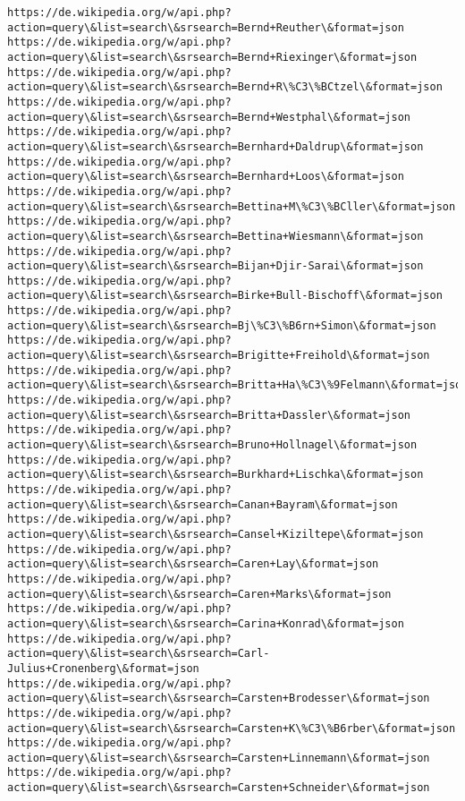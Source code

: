 \documentclass[11pt]{article}
\begin{document}
\begin{Verbatim}[commandchars=\\\{\}]
https://de.wikipedia.org/w/api.php?action=query\&list=search\&srsearch=Bernd+Reuther\&format=json
https://de.wikipedia.org/w/api.php?action=query\&list=search\&srsearch=Bernd+Riexinger\&format=json
https://de.wikipedia.org/w/api.php?action=query\&list=search\&srsearch=Bernd+R\%C3\%BCtzel\&format=json
https://de.wikipedia.org/w/api.php?action=query\&list=search\&srsearch=Bernd+Westphal\&format=json
https://de.wikipedia.org/w/api.php?action=query\&list=search\&srsearch=Bernhard+Daldrup\&format=json
https://de.wikipedia.org/w/api.php?action=query\&list=search\&srsearch=Bernhard+Loos\&format=json
https://de.wikipedia.org/w/api.php?action=query\&list=search\&srsearch=Bettina+M\%C3\%BCller\&format=json
https://de.wikipedia.org/w/api.php?action=query\&list=search\&srsearch=Bettina+Wiesmann\&format=json
https://de.wikipedia.org/w/api.php?action=query\&list=search\&srsearch=Bijan+Djir-Sarai\&format=json
https://de.wikipedia.org/w/api.php?action=query\&list=search\&srsearch=Birke+Bull-Bischoff\&format=json
https://de.wikipedia.org/w/api.php?action=query\&list=search\&srsearch=Bj\%C3\%B6rn+Simon\&format=json
https://de.wikipedia.org/w/api.php?action=query\&list=search\&srsearch=Brigitte+Freihold\&format=json
https://de.wikipedia.org/w/api.php?action=query\&list=search\&srsearch=Britta+Ha\%C3\%9Felmann\&format=json
https://de.wikipedia.org/w/api.php?action=query\&list=search\&srsearch=Britta+Dassler\&format=json
https://de.wikipedia.org/w/api.php?action=query\&list=search\&srsearch=Bruno+Hollnagel\&format=json
https://de.wikipedia.org/w/api.php?action=query\&list=search\&srsearch=Burkhard+Lischka\&format=json
https://de.wikipedia.org/w/api.php?action=query\&list=search\&srsearch=Canan+Bayram\&format=json
https://de.wikipedia.org/w/api.php?action=query\&list=search\&srsearch=Cansel+Kiziltepe\&format=json
https://de.wikipedia.org/w/api.php?action=query\&list=search\&srsearch=Caren+Lay\&format=json
https://de.wikipedia.org/w/api.php?action=query\&list=search\&srsearch=Caren+Marks\&format=json
https://de.wikipedia.org/w/api.php?action=query\&list=search\&srsearch=Carina+Konrad\&format=json
https://de.wikipedia.org/w/api.php?action=query\&list=search\&srsearch=Carl-Julius+Cronenberg\&format=json
https://de.wikipedia.org/w/api.php?action=query\&list=search\&srsearch=Carsten+Brodesser\&format=json
https://de.wikipedia.org/w/api.php?action=query\&list=search\&srsearch=Carsten+K\%C3\%B6rber\&format=json
https://de.wikipedia.org/w/api.php?action=query\&list=search\&srsearch=Carsten+Linnemann\&format=json
https://de.wikipedia.org/w/api.php?action=query\&list=search\&srsearch=Carsten+Schneider\&format=json

\end{Verbatim}
\end{document}
